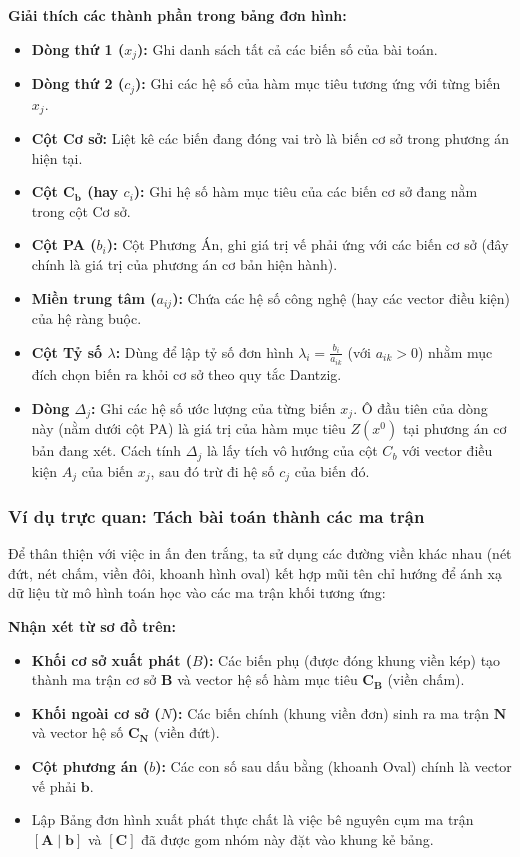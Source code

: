 \textbf{Giải thích các thành phần trong bảng đơn hình:}
\begin{itemize}
    \item \textbf{Dòng thứ 1 ($x_j$):} Ghi danh sách tất cả các biến số của bài toán.
    \item \textbf{Dòng thứ 2 ($c_j$):} Ghi các hệ số của hàm mục tiêu tương ứng với từng biến $x_j$.
    \item \textbf{Cột Cơ sở:} Liệt kê các biến đang đóng vai trò là biến cơ sở trong phương án hiện tại.
    \item \textbf{Cột $\mathbf{C_b}$ (hay $c_i$):} Ghi hệ số hàm mục tiêu của các biến cơ sở đang nằm trong cột Cơ sở.
    \item \textbf{Cột PA ($b_i$):} Cột Phương Án, ghi giá trị vế phải ứng với các biến cơ sở (đây chính là giá trị của phương án cơ bản hiện hành).
    \item \textbf{Miền trung tâm ($a_{ij}$):} Chứa các hệ số công nghệ (hay các vector điều kiện) của hệ ràng buộc.
    \item \textbf{Cột Tỷ số $\lambda$:} Dùng để lập tỷ số đơn hình $\lambda_i = \frac{b_i}{a_{ik}}$ (với $a_{ik} > 0$) nhằm mục đích chọn biến ra khỏi cơ sở theo quy tắc Dantzig.
    \item \textbf{Dòng $\Delta_j$:} Ghi các hệ số ước lượng của từng biến $x_j$. Ô đầu tiên của dòng này (nằm dưới cột PA) là giá trị của hàm mục tiêu $Z(x^0)$ tại phương án cơ bản đang xét. Cách tính $\Delta_j$ là lấy tích vô hướng của cột $C_b$ với vector điều kiện $A_j$ của biến $x_j$, sau đó trừ đi hệ số $c_j$ của biến đó.
\end{itemize}

\subsubsection*{Ví dụ trực quan: Tách bài toán thành các ma trận}

Để thân thiện với việc in ấn đen trắng, ta sử dụng các đường viền khác nhau (nét đứt, nét chấm, viền đôi, khoanh hình oval) kết hợp mũi tên chỉ hướng để ánh xạ dữ liệu từ mô hình toán học vào các ma trận khối tương ứng:



\textbf{Nhận xét từ sơ đồ trên:}
\begin{itemize}[itemsep=0pt, parsep=0pt, topsep=5pt]
    \item \textbf{Khối cơ sở xuất phát ($B$):} Các biến phụ (được đóng khung viền kép) tạo thành ma trận cơ sở $\mathbf{B}$ và vector hệ số hàm mục tiêu $\mathbf{C_B}$ (viền chấm).
    \item \textbf{Khối ngoài cơ sở ($N$):} Các biến chính (khung viền đơn) sinh ra ma trận $\mathbf{N}$ và vector hệ số $\mathbf{C_N}$ (viền đứt).
    \item \textbf{Cột phương án ($b$):} Các con số sau dấu bằng (khoanh Oval) chính là vector vế phải $\mathbf{b}$.
    \item Lập Bảng đơn hình xuất phát thực chất là việc bê nguyên cụm ma trận $[\mathbf{A} \;|\; \mathbf{b}]$ và $[\mathbf{C}]$ đã được gom nhóm này đặt vào khung kẻ bảng.
\end{itemize}

